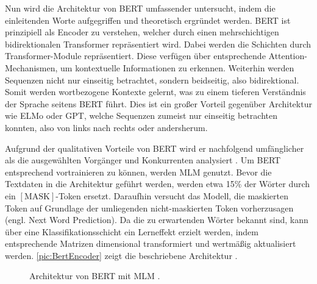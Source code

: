 \noindent
Nun wird die Architektur von \ac{BERT} umfassender untersucht, indem die einleitenden Worte aufgegriffen und theoretisch ergründet werden. \ac{BERT} ist prinzipiell als Encoder zu verstehen, welcher durch einen mehrschichtigen bidirektionalen Transformer repräsentiert wird. Dabei werden die Schichten durch Transformer-Module repräsentiert. Diese verfügen über entsprechende Attention-Mechanismen, um kontextuelle Informationen zu erkennen. Weiterhin werden Sequenzen nicht nur einseitig betrachtet, sondern beidseitig, also bidirektional. Somit werden wortbezogene Kontexte gelernt, was zu einem tieferen Verständnis der Sprache seitens \ac{BERT} führt. Dies ist ein großer Vorteil gegenüber Architektur wie \ac{ELMo} oder \ac{GPT}, welche Sequenzen zumeist nur einseitig betrachten konnten, also von links nach rechts oder andersherum.
\newpage

\noindent
Aufgrund der qualitativen Vorteile von \ac{BERT} wird er nachfolgend umfänglicher als die ausgewählten Vorgänger und Konkurrenten analysiert \cite[S.~3]{DEV19}. Um \ac{BERT} entsprechend vortrainieren zu können, werden \ac{MLM} genutzt. Bevor die Textdaten in die Architektur geführt werden, werden etwa 15\% der Wörter durch ein $[\text{MASK}]$-Token ersetzt. Daraufhin versucht das Modell, die maskierten Token auf Grundlage der umliegenden nicht-maskierten Token vorherzusagen (engl. Next Word Prediction). Da die zu erwartenden Wörter bekannt sind, kann über eine Klassifikationsschicht ein Lerneffekt erzielt werden, indem entsprechende Matrizen dimensional transformiert und wertmäßig aktualisiert werden. \autoref{pic:BertEncoder} zeigt die beschriebene Architektur \cite[S.~4-5]{DEV19}.\\

\begin{figure}[h!]
  \centering
  \caption{Architektur von BERT mit MLM \cite[S.~3]{DEV19}.}
  \label{pic:BertEncoder}
\end{figure}

